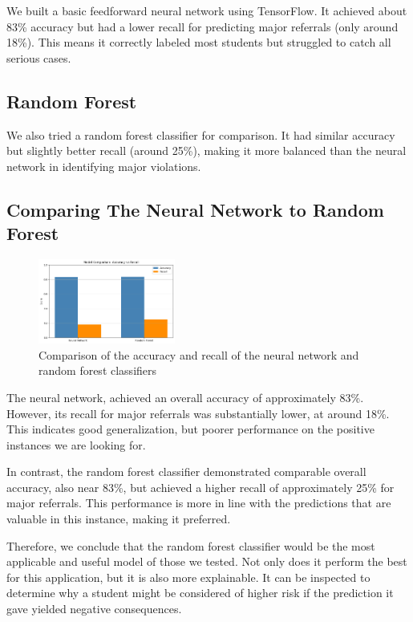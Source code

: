 \documentclass[letterpaper]{article}
\begin{document}
We built a basic feedforward neural network using TensorFlow. It 
achieved about 83\% accuracy but had a lower recall for predicting 
major referrals (only around 18\%). This means it correctly labeled 
most students but struggled to catch all serious cases.

\subsection*{Random Forest}

We also tried a random forest classifier for comparison. It had 
similar accuracy but slightly better recall (around 25\%), making it 
more balanced than the neural network in identifying major violations.

\subsection*{Comparing The Neural Network to Random Forest}

\begin{figure}[htbp]
    \centering
    \includegraphics[width=0.4\textwidth]{4220_figures/nn_vs_rf.png}
    \caption{Comparison of the accuracy and recall of the neural network and random forest classifiers}
    \label{fig:linear}
\end{figure}

The neural network, achieved an overall accuracy of approximately 83\%. 
However, its recall for major referrals was substantially lower, at 
around 18\%. This indicates good generalization, but poorer performance
on the positive instances we are looking for.

In contrast, the random forest classifier demonstrated comparable overall 
accuracy, also near 83\%, but achieved a higher recall of approximately 
25\% for major referrals. This performance is more in line with the 
predictions that are valuable in this instance, making it preferred.

Therefore, we conclude that the random forest classifier would be the most 
applicable and useful model of those we tested. Not only does it perform
the best for this application, but it is also more explainable. It can be
inspected to determine why a student might be considered of higher risk
if the prediction it gave yielded negative consequences.
\end{document}

